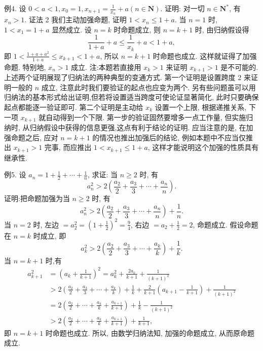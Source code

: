 例4. 设 $0<a<1, x_0=1, x_{n+1}=\frac{1}{x_n}+a(n \in \mathbf{N})$. 证明: 对一切 $n \in \mathbf{N}^*$, 有 $x_n>1$.
证法 2 我们主动加强命题, 证明 $1<x_n \leqslant 1+a$.
当 $n=1$ 时, $1<x_1=1+a$ 显然成立.
设 $n=k$ 时命题成立, 则 $n=k+1$ 时, 由归纳假设得
$$
\frac{1}{1+a}+a \leqslant \frac{1}{x_k}+a<1+a,
$$
即 $1<\frac{1+a+a^2}{1+a} \leqslant x_{k+1}<1+a$, 所以 $n=k+1$ 时命题也成立.
这样就证得了加强命题.
特别地, $x_n>1$ 成立.
注:本题若直接用 $x_k>1$ 来证明 $x_{k+1}>1$ 是不可能的.
上述两个证明展现了归纳法的两种典型的变通方式.
第一个证明是设置跨度 2 来证明一般的 $n$ 成立, 注意此时我们要验证的起点也应变为两个.
另有些问题虽可以用归纳法的基本形式给出证明,但若将设置适当跨度可使论证显著简化, 此时只要确保起点都能逐一验证即可.
第二个证明是主动给 $x_k$ 设置一个上限, 根据递推关系, 下一项 $x_{k+1}$ 就自动得到一个下限.
第一步的验证固然要增多一点工作量, 但实施归纳时, 从归纳假设中获得的信息更强,这点有利于结论的证明.
应当注意的是, 在加强命题之后, 应对 $n=k+1$ 的情况也推出加强后的结论, 例如本题中不应当仅推出 $x_{k+1}>1$ 完事, 而应推出 $1<x_{k+1} \leqslant 1+a$, 这样才能说明这个加强的性质具有继承性.



例5. 设 $a_n=1+\frac{1}{2}+\cdots+\frac{1}{n}$, 求证: 当 $n \geqslant 2$ 时, 有
$$
a_n^2>2\left(\frac{a_2}{2}+\frac{a_3}{3}+\cdots+\frac{a_n}{n}\right) .
$$
证明:把命题加强为当 $n \geqslant 2$ 时, 有
$$
a_n^2>2\left(\frac{a_2}{2}+\frac{a_3}{3}+\cdots+\frac{a_n}{n}\right)+\frac{1}{n} .
$$
当 $n=2$ 时, 左边 $=a_2^2=\left(1+\frac{1}{2}\right)^2=\frac{9}{4}$, 右边 $=a_2+\frac{1}{2}=2$, 命题成立.
假设命题在 $n=k$ 时成立, 即
$$
a_k^2>2\left(\frac{a_2}{2}+\frac{a_3}{3}+\cdots+\frac{a_k}{k}\right)+\frac{1}{k} .
$$
当 $n=k+1$ 时,有
$$
\begin{aligned}
a_{k+1}^2 & =\left(a_k+\frac{1}{k+1}\right)^2=a_k^2+\frac{2 a_k}{k+1}+\frac{1}{(k+1)^2} \\
& >2\left(\frac{a_2}{2}+\frac{a_3}{3}+\cdots+\frac{a_k}{k}\right)+\frac{1}{k}+\frac{2}{k+1}\left(a_{k+1}-\frac{1}{k+1}\right)+\frac{1}{(k+1)^2} \\
& =2\left(\frac{a_2}{2}+\cdots+\frac{a_k}{k}+\frac{a_{k+1}}{k+1}\right)+\frac{1}{k}-\frac{1}{(k+1)^2} \\
& >2\left(\frac{a_2}{2}+\cdots+\frac{a_k}{k}+\frac{a_{k+1}}{k+1}\right)+\frac{1}{k+1},
\end{aligned}
$$
即 $n=k+1$ 时命题也成立.
所以, 由数学归纳法知, 加强的命题成立, 从而原命题成立.



